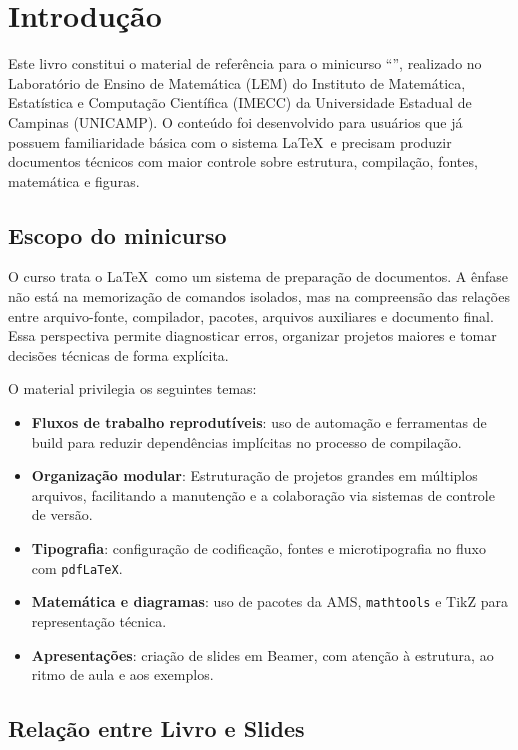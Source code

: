 \chapter{Introdução}

Este livro constitui o material de referência para o minicurso ``\booktitle'', realizado no Laboratório de Ensino de Matemática (LEM) do Instituto de Matemática, Estatística e Computação Científica (IMECC) da Universidade Estadual de Campinas (UNICAMP). O conteúdo foi desenvolvido para usuários que já possuem familiaridade básica com o sistema \LaTeX\ e precisam produzir documentos técnicos com maior controle sobre estrutura, compilação, fontes, matemática e figuras.

\section{Escopo do minicurso}

O curso trata o \LaTeX\ como um sistema de preparação de documentos. A ênfase não está na memorização de comandos isolados, mas na compreensão das relações entre arquivo-fonte, compilador, pacotes, arquivos auxiliares e documento final. Essa perspectiva permite diagnosticar erros, organizar projetos maiores e tomar decisões técnicas de forma explícita.

O material privilegia os seguintes temas:
\begin{itemize}
    \item \textbf{Fluxos de trabalho reprodutíveis}: uso de automação e ferramentas de build para reduzir dependências implícitas no processo de compilação.
    \item \textbf{Organização modular}: Estruturação de projetos grandes em múltiplos arquivos, facilitando a manutenção e a colaboração via sistemas de controle de versão.
    \item \textbf{Tipografia}: configuração de codificação, fontes e microtipografia no fluxo com \texttt{pdfLaTeX}.
    \item \textbf{Matemática e diagramas}: uso de pacotes da AMS, \texttt{mathtools} e TikZ para representação técnica.
    \item \textbf{Apresentações}: criação de slides em Beamer, com atenção à estrutura, ao ritmo de aula e aos exemplos.
\end{itemize}

\section{Relação entre Livro e Slides}

